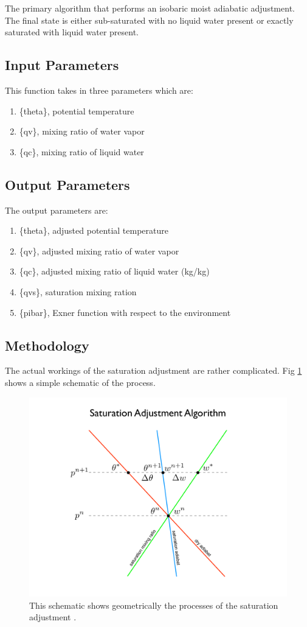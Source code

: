 \documentclass{article}
\begin{document}
The primary algorithm that performs an isobaric moist adiabatic adjustment. The final state is either sub-saturated with no liquid water present or exactly saturated with liquid water present.

\subsection{Input Parameters} 
This function takes in three parameters which are:

\begin{enumerate}
\item \{theta\}, potential temperature
\item \{qv\}, mixing ratio of water vapor
\item \{qc\}, mixing ratio of liquid water
\end{enumerate}


\subsection{Output Parameters}
The output parameters are:

\begin{enumerate}
\item \{theta\}, adjusted potential temperature
\item \{qv\}, adjusted mixing ratio of water vapor
\item \{qc\}, adjusted mixing ratio of liquid water (kg/kg)
\item \{qvs\}, saturation mixing ration
\item \{pibar\}, Exner function with respect to the environment
\end{enumerate}

\subsection{Methodology}
The actual workings of the saturation adjustment are rather complicated. Fig \ref{fig:satadjust} shows a simple schematic of the process.

\begin{figure}
\centering
\includegraphics[width=4.5in]{satadjust.pdf}
\caption{This schematic shows geometrically the processes of the saturation adjustment \cite{krueger}.}
\label{fig:satadjust}
\end{figure}
\end{document}
